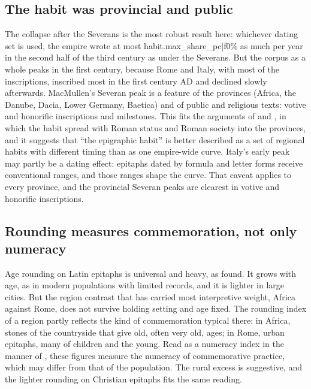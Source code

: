 \subsection{The habit was provincial and public}
The collapse after the Severans is the most robust result here: whichever dating set is used, the empire wrote at most {{habit.max_share_pc|f0}}\% as much per year in the second half of the third century as under the Severans. But the corpus as a whole peaks in the first century, because Rome and Italy, with most of the inscriptions, inscribed most in the first century AD and declined slowly afterwards. MacMullen's Severan peak is a feature of the provinces (Africa, the Danube, Dacia, Lower Germany, Baetica) and of public and religious texts: votive and honorific inscriptions and milestones. This fits the arguments of \citet{meyer1990} and \citet{woolf1996}, in which the habit spread with Roman status and Roman society into the provinces, and it suggests that ``the epigraphic habit'' is better described as a set of regional habits with different timing than as one empire-wide curve. Italy's early peak may partly be a dating effect: epitaphs dated by formula and letter forms receive conventional ranges, and those ranges shape the curve. That caveat applies to every province, and the provincial Severan peaks are clearest in votive and honorific inscriptions.

\subsection{Rounding measures commemoration, not only numeracy}
Age rounding on Latin epitaphs is universal and heavy, as \citet{duncanjones1977} found. It grows with age, as in modern populations with limited records, and it is lighter in large cities. But the region contrast that has carried most interpretive weight, Africa against Rome, does not survive holding setting and age fixed. The rounding index of a region partly reflects the kind of commemoration typical there: in Africa, stones of the countryside that give old, often very old, ages; in Rome, urban epitaphs, many of children and the young. Read as a numeracy index in the manner of \citet{ahearn2009}, these figures measure the numeracy of commemorative practice, which may differ from that of the population. The rural excess is suggestive, and the lighter rounding on Christian epitaphs fits the same reading.

